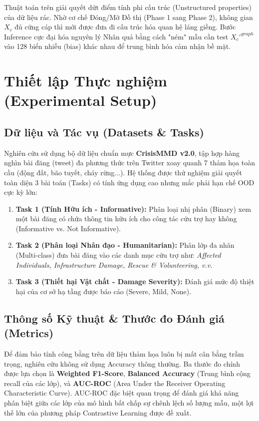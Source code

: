 \documentclass[11pt,a4paper]{article}
\begin{document}
Thuật toán trên giải quyết dứt điểm tính phi cấu trúc (Unstructured properties) của dữ liệu rác. Nhờ cơ chế Đóng/Mở Đồ thị (Phase 1 sang Phase 2), không gian $X_c$ đủ cứng cáp thì mới được đưa đi cấu trúc hóa quan hệ láng giềng. Bước Inference cực đại hóa nguyên lý Nhân quả bằng cách "ném" mẫu cần test $X_c'^{graph}$ vào 128 biển nhiễu (bias) khác nhau để trung bình hóa cảm nhận bề mặt.

\section{Thiết lập Thực nghiệm (Experimental Setup)}

\subsection{Dữ liệu và Tác vụ (Datasets \& Tasks)}
Nghiên cứu sử dụng bộ dữ liệu chuẩn mực \textbf{CrisisMMD v2.0}, tập hợp hàng nghìn bài đăng (tweet) đa phương thức trên Twitter xoay quanh 7 thảm họa toàn cầu (động đất, bão tuyết, cháy rừng...). Hệ thống được thử nghiệm giải quyết toàn diện 3 bài toán (Tasks) có tính ứng dụng cao nhưng mắc phải hạn chế OOD cực kỳ lớn:
\begin{enumerate}
    \item \textbf{Task 1 (Tính Hữu ích - Informative):} Phân loại nhị phân (Binary) xem một bài đăng có chứa thông tin hữu ích cho công tác cứu trợ hay không (Informative vs. Not Informative).
    \item \textbf{Task 2 (Phân loại Nhân đạo - Humanitarian):} Phân lớp đa nhãn (Multi-class) đưa bài đăng vào các danh mục cứu trợ như: \textit{Affected Individuals, Infrastructure Damage, Rescue \& Volunteering, v.v.}
    \item \textbf{Task 3 (Thiết hại Vật chất - Damage Severity):} Đánh giá mức độ thiệt hại của cơ sở hạ tầng được báo cáo (Severe, Mild, None).
\end{enumerate}

\subsection{Thông số Kỹ thuật \& Thước đo Đánh giá (Metrics)}
Để đảm bảo tính công bằng trên dữ liệu thảm họa luôn bị mất cân bằng trầm trọng, nghiên cứu không sử dụng Accuracy thông thường. Ba thước đo chính được lựa chọn là \textbf{Weighted F1-Score}, \textbf{Balanced Accuracy} (Trung bình cộng recall của các lớp), và \textbf{AUC-ROC} (Area Under the Receiver Operating Characteristic Curve). AUC-ROC đặc biệt quan trọng để đánh giá khả năng phân biệt giữa các lớp của mô hình bất chấp sự chênh lệch số lượng mẫu, một lợi thế lớn của phương pháp Contrastive Learning được đề xuất.
\end{document}
